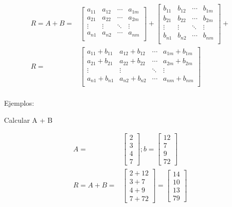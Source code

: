\begin{align*}
    R =A+B =
    &\begin{bmatrix}
        a_{11} & a_{12} & \cdots & a_{1m}\\
        a_{21} & a_{22} & \cdots & a_{2m}\\
        \vdots & \vdots & \ddots & \vdots\\
        a_{n1} & a_{n2} & \cdots & a_{nm}\\
    \end{bmatrix} +
    \begin{bmatrix}
        b_{11} & b_{12} & \cdots & b_{1m}\\
        b_{21} & b_{22} & \cdots & b_{2m}\\
        \vdots & \vdots & \ddots & \vdots\\
        b_{n1} & b_{n2} & \cdots & b_{nm}\\
    \end{bmatrix} +  \\
    R =
    &\begin{bmatrix}
        a_{11}+b_{11} & a_{12}+ b_{12} & \cdots & a_{1m}+ b_{1m}\\
        a_{21}+ b_{21  }  & a_{22}+ b_{22 }& \cdots & a_{2m} + b_{2m}\\
        \vdots & \vdots & \ddots & \vdots\\
        a_{n1}+ b_{n1} & a_{n2}+ b_{n2} & \cdots & a_{nm}+ b_{nm}\\
    \end{bmatrix}  \\
\end{align*}

Ejemplos:

Calcular A + B

\begin{align*}
    A =
    &\begin{bmatrix}
        2 \\
        3\\
        4\\
        7
    \end{bmatrix}
    ;b=
    \begin{bmatrix}
        12 \\
        7\\
        9\\
        72
    \end{bmatrix}\\
    R = A+B=
    &\begin{bmatrix}
        2+12 \\
        3+7\\
        4+9\\
        7+72
    \end{bmatrix}
    =
    \begin{bmatrix}
        14 \\
        10\\
        13\\
        79
    \end{bmatrix}
\end{align*}

